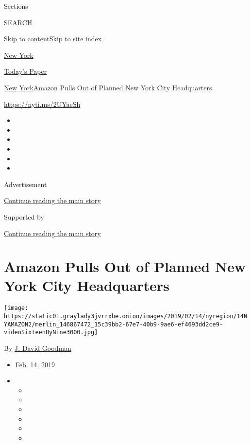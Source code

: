 Sections

SEARCH

\protect\hyperlink{site-content}{Skip to
content}\protect\hyperlink{site-index}{Skip to site index}

\href{https://www.nytimes3xbfgragh.onion/section/nyregion}{New York}

\href{https://myaccount.nytimes3xbfgragh.onion/auth/login?response_type=cookie\&client_id=vi}{}

\href{https://www.nytimes3xbfgragh.onion/section/todayspaper}{Today's
Paper}

\href{/section/nyregion}{New York}\textbar{}Amazon Pulls Out of Planned
New York City Headquarters

\href{https://nyti.ms/2UYaeSh}{https://nyti.ms/2UYaeSh}

\begin{itemize}
\item
\item
\item
\item
\item
\item
\end{itemize}

Advertisement

\protect\hyperlink{after-top}{Continue reading the main story}

Supported by

\protect\hyperlink{after-sponsor}{Continue reading the main story}

\hypertarget{amazon-pulls-out-of-planned-new-york-city-headquarters}{%
\section{Amazon Pulls Out of Planned New York City
Headquarters}\label{amazon-pulls-out-of-planned-new-york-city-headquarters}}

\texttt{[image: https://static01.graylady3jvrrxbe.onion/images/2019/02/14/nyregion/14NYAMAZON2/merlin\_146867472\_15c39bb2-67e7-40b9-9ae6-ef4693dd2ce9-videoSixteenByNine3000.jpg]}

By \href{https://www.nytimes3xbfgragh.onion/by/j-david-goodman}{J. David
Goodman}

\begin{itemize}
\item
  Feb. 14, 2019
\item
  \begin{itemize}
  \item
  \item
  \item
  \item
  \item
  \item
  \end{itemize}
\end{itemize}

